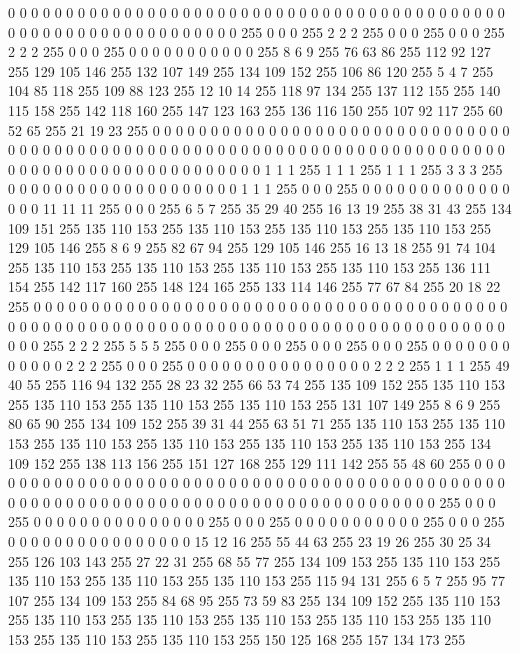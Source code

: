 0 0 0 0 0 0 0 0 0 0 0 0 0 0 0 0 0 0 0 0 0 0 0 0 0 0 0 0 0 0 0 0 0 0 0 0 0 0 0 0 0 0 0 0 0 0 0 0 0 0 0 0 0 0 0 0 0 0 0 0 0 0 0 255
0 0 0 255 2 2 2 255 0 0 0 255 0 0 0 255 2 2 2 255 0 0 0 255 0 0 0 0 0 0 0 0 0 0 0 255 8 6 9 255 76 63 86 255 112 92 127 255 129 105 146 255 132 107 149 255 134 109 152 255 106 86 120 255
5 4 7 255 104 85 118 255 109 88 123 255 12 10 14 255 118 97 134 255 137 112 155 255 140 115 158 255 142 118 160 255 147 123 163 255 136 116 150 255 107 92 117 255 60 52 65 255 21 19 23 255 0 0 0 0 0 0 0 0 0 0 0 0
0 0 0 0 0 0 0 0 0 0 0 0 0 0 0 0 0 0 0 0 0 0 0 0 0 0 0 0 0 0 0 0 0 0 0 0 0 0 0 0 0 0 0 0 0 0 0 0 0 0 0 0 0 0 0 0 0 0 0 0 0 0 0 0
0 0 0 0 0 0 0 0 0 0 0 0 0 0 0 0 0 0 0 0 1 1 1 255 1 1 1 255 1 1 1 255 3 3 3 255 0 0 0 0 0 0 0 0 0 0 0 0 0 0 0 0 0 0 0 0 1 1 1 255 0 0 0 255
0 0 0 0 0 0 0 0 0 0 0 0 0 0 0 0 11 11 11 255 0 0 0 255 6 5 7 255 35 29 40 255 16 13 19 255 38 31 43 255 134 109 151 255 135 110 153 255 135 110 153 255 135 110 153 255 135 110 153 255 129 105 146 255
8 6 9 255 82 67 94 255 129 105 146 255 16 13 18 255 91 74 104 255 135 110 153 255 135 110 153 255 135 110 153 255 135 110 153 255 136 111 154 255 142 117 160 255 148 124 165 255 133 114 146 255 77 67 84 255 20 18 22 255 0 0 0 0
0 0 0 0 0 0 0 0 0 0 0 0 0 0 0 0 0 0 0 0 0 0 0 0 0 0 0 0 0 0 0 0 0 0 0 0 0 0 0 0 0 0 0 0 0 0 0 0 0 0 0 0 0 0 0 0 0 0 0 0 0 0 0 0
0 0 0 0 0 0 0 0 0 0 0 0 0 0 0 0 0 0 0 255 2 2 2 255 5 5 5 255 0 0 0 255 0 0 0 255 0 0 0 255 0 0 0 255 0 0 0 0 0 0 0 0 0 0 0 0 2 2 2 255 0 0 0 255
0 0 0 0 0 0 0 0 0 0 0 0 0 0 0 0 2 2 2 255 1 1 1 255 49 40 55 255 116 94 132 255 28 23 32 255 66 53 74 255 135 109 152 255 135 110 153 255 135 110 153 255 135 110 153 255 135 110 153 255 131 107 149 255
8 6 9 255 80 65 90 255 134 109 152 255 39 31 44 255 63 51 71 255 135 110 153 255 135 110 153 255 135 110 153 255 135 110 153 255 135 110 153 255 135 110 153 255 134 109 152 255 138 113 156 255 151 127 168 255 129 111 142 255 55 48 60 255
0 0 0 0 0 0 0 0 0 0 0 0 0 0 0 0 0 0 0 0 0 0 0 0 0 0 0 0 0 0 0 0 0 0 0 0 0 0 0 0 0 0 0 0 0 0 0 0 0 0 0 0 0 0 0 0 0 0 0 0 0 0 0 0
0 0 0 0 0 0 0 0 0 0 0 0 0 0 0 0 0 0 0 255 0 0 0 255 0 0 0 0 0 0 0 0 0 0 0 0 0 0 0 255 0 0 0 255 0 0 0 0 0 0 0 0 0 0 0 255 0 0 0 255 0 0 0 0
0 0 0 0 0 0 0 0 0 0 0 0 15 12 16 255 55 44 63 255 23 19 26 255 30 25 34 255 126 103 143 255 27 22 31 255 68 55 77 255 134 109 153 255 135 110 153 255 135 110 153 255 135 110 153 255 135 110 153 255 115 94 131 255
6 5 7 255 95 77 107 255 134 109 153 255 84 68 95 255 73 59 83 255 134 109 152 255 135 110 153 255 135 110 153 255 135 110 153 255 135 110 153 255 135 110 153 255 135 110 153 255 135 110 153 255 135 110 153 255 150 125 168 255 157 134 173 255

